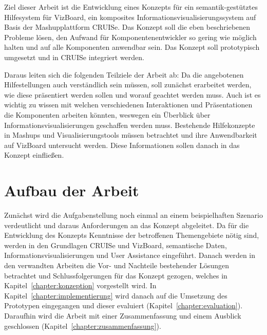 \documentclass[
	headsepline,
	footsepline,
	fontsize=12pt,
	bibliography=totoc
]{scrbook}
\begin{document}

Ziel dieser Arbeit ist die Entwicklung eines Konzepts für ein semantik-gestütztes Hilfesystem für VizBoard, ein komposites Informationsvisualisierungssystem auf Basis der Mashupplattform CRUISe. Das Konzept soll die eben beschriebenen Probleme lösen, den Aufwand für Komponentenentwickler so gering wie möglich halten und auf alle Komponenten anwendbar sein. Das Konzept soll prototypisch umgesetzt und in CRUISe integriert werden.


Daraus leiten sich die folgenden Teilziele der Arbeit ab: Da die angebotenen Hilfestellungen auch verständlich sein müssen, soll zunächst erarbeitet werden, wie diese präsentiert werden sollen und worauf geachtet werden muss. Auch ist es wichtig zu wissen mit welchen verschiedenen Interaktionen und Präsentationen die Komponenten arbeiten könnten, weswegen ein Überblick über Informationsvisualisierungen geschaffen werden muss. Bestehende Hilfekonzepte in Mashups und Visualisierungstools müssen betrachtet und ihre Anwendbarkeit auf VizBoard untersucht werden. Diese Informationen sollen danach in das Konzept einfließen.

\section{Aufbau der Arbeit}
\label{section:einleitung:aufbau}

Zunächst wird die Aufgabenstellung noch einmal an einem beispielhaften Szenario verdeutlicht und daraus Anforderungen an das Konzept abgeleitet. Da für die Entwicklung des Konzepts Kenntnisse der betroffenen Themengebiete nötig sind, werden in den Grundlagen CRUISe und VizBoard, semantische Daten, Informationsvisualisierungen und User Assistance eingeführt. Danach werden in den verwandten Arbeiten die Vor- und Nachteile bestehender Lösungen betrachtet und Schlussfolgerungen für das Konzept gezogen, welches in Kapitel~\ref{chapter:konzeption} vorgestellt wird. In Kapitel~\ref{chapter:implementierung} wird danach auf die Umsetzung des Prototypen eingegangen und dieser evaluiert (Kapitel~\ref{chapter:evaluation}). Daraufhin wird die Arbeit mit einer Zusammenfassung und einem Ausblick geschlossen (Kapitel~\ref{chapter:zusammenfassung}).
\end{document}
